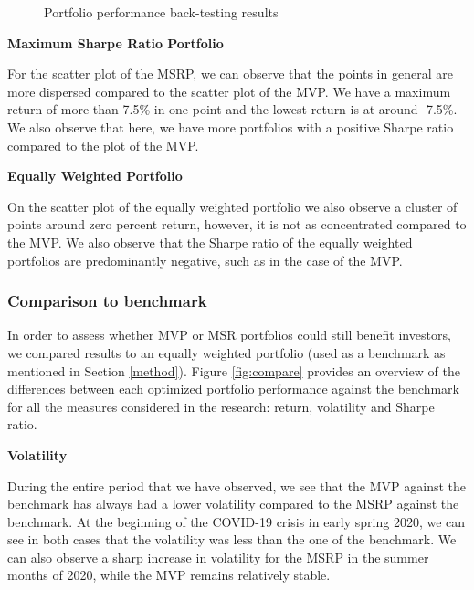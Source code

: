 \documentclass[a4paper,12pt]{article}
\begin{document}
\begin{figure}[H]
\begin{minipage}{0.7\textwidth}
    \end{minipage}
    \caption{Portfolio performance back-testing results}
    \label{fig:scatter}
\end{figure}


\textbf{Maximum Sharpe Ratio Portfolio}

For the scatter plot of the MSRP, we can observe that the points in general are more dispersed compared to the scatter plot of the MVP. We have a maximum return of more than 7.5\% in one point and the lowest return is at around -7.5\%. We also observe that here, we have more portfolios with a positive Sharpe ratio compared to the plot of the MVP.

\textbf{Equally Weighted Portfolio}

On the scatter plot of the equally weighted portfolio we also observe a cluster of points around zero percent return, however, it is not as concentrated compared to the MVP. We also observe that the Sharpe ratio of the equally weighted portfolios are predominantly negative, such as in the case of the MVP.


\subsubsection{Comparison to benchmark}

In order to assess whether MVP or MSR portfolios could still benefit investors, we compared results to an equally weighted portfolio (used as a benchmark as mentioned in Section \ref{method}). Figure \ref{fig:compare} provides an overview of the differences between each optimized portfolio performance against the benchmark for all the measures considered in the research: return, volatility and Sharpe ratio. 

\textbf{Volatility}

During the entire period that we have observed, we see that the MVP against the benchmark has always had a lower volatility compared to the MSRP against the benchmark. At the beginning of the COVID-19 crisis in early spring 2020, we can see in both cases that the volatility was less than the one of the benchmark. We can also observe a sharp increase in volatility for the MSRP in the summer months of 2020, while the MVP remains relatively stable.
\end{document}

